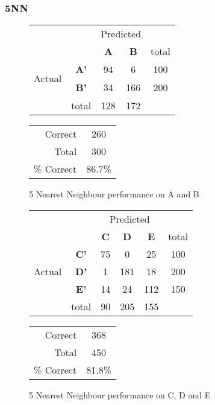 \subsubsection{5NN}
\begin{figure}[!ht]
\begin{minipage}[b]{0.5\linewidth}
\centering
	\begin{tabular}{ccc|c|c}
	 & &\multicolumn{2}{c}{Predicted} &\\
	  & & \bf{A} &  \bf{B} & total \\
	 \cline{3-5}
	 \multirow{2}{*}{\begin{sideways}Actual\end{sideways}} & \bf{A'}& 94 & 6 & 100 \\
	 \cline{3-5}
	 & \bf{B'}& 34 & 166 & 200 \\
	  \cline{3-5}
	 &total&128&172\\
	\end{tabular}
\end{minipage}
\hspace{0.5cm}
\begin{minipage}[b]{0.5\linewidth}
	\begin{tabular}{r|c}
	\hline
	Correct& 260\\
	Total& 300\\
	\hline
	\% Correct& 86.7\%\\
	\hline
	\end{tabular}
\end{minipage}
\vspace{1mm}
\caption{5 Nearest Neighbour performance on A and B}
\end{figure}

	
\begin{figure}[!ht]
\begin{minipage}[b]{0.5\linewidth}
\centering
	\begin{tabular}{ccc|c|c|c}
	 & &\multicolumn{3}{c}{Predicted} &\\
	  & & \bf{C} &  \bf{D} & \bf{E} & total \\
	 \cline{3-6}
	 \multirow{3}{*}{\begin{sideways}Actual\end{sideways}} & \bf{C'}& 75 & 0 & 25 & 100\\
	 \cline{3-6}
	 & \bf{D'}& 1 & 181 & 18 & 200\\
	  \cline{3-6}
	 & \bf{E'}& 14 & 24 & 112 &  150\\
	  \cline{3-6}
	 &total&90&205&155\\
	\end{tabular}
\end{minipage}
\hspace{0.5cm}
\begin{minipage}[b]{0.5\linewidth}
	\begin{tabular}{r|c}
	\hline
	Correct& 368\\
	Total& 450\\
	\hline
	\% Correct& 81.8\%\\
	\hline
	\end{tabular}
\end{minipage}
\vspace{1mm}
\caption{5 Nearest Neighbour performance on C, D and E}
\end{figure}

